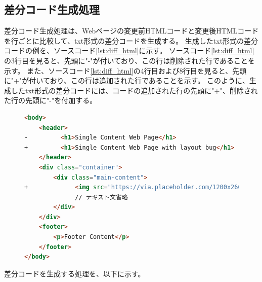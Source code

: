\subsection{差分コード生成処理}\label{subsec:diff_file_generate}
差分コード生成処理は、Webページの変更前HTMLコードと変更後HTMLコードを行ごとに比較して、txt形式の差分コードを生成する。
生成したtxt形式の差分コードの例を、ソースコード\ref{lst:diff_html}に示す。
ソースコード\ref{lst:diff_html}の3行目を見ると、先頭に"-"が付いており、この行は削除された行であることを示す。
また、ソースコード\ref{lst:diff_html}の4行目および8行目を見ると、先頭に"+"が付いており、この行は追加された行であることを示す。
このように、生成したtxt形式の差分コードには、コードの追加された行の先頭に"+"、削除された行の先頭に"-"を付加する。
\begin{figure}[tp]
    \begin{lstlisting}[language=HTML, caption=生成したtxt形式の差分コードの例, label=lst:diff_html]
<body>
    <header>
-         <h1>Single Content Web Page</h1>
+         <h1>Single Content Web Page with layout bug</h1>
    </header>
    <div class="container">
        <div class="main-content">
+             <img src="https://via.placeholder.com/1200x260" alt="Placeholder Image">
              // テキスト文省略
        </div>
    </div>
    <footer>
        <p>Footer Content</p>
    </footer>
</body>
    \end{lstlisting}
\end{figure}
\par
差分コードを生成する処理を、以下に示す。
